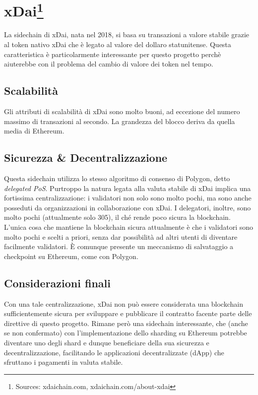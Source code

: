 \documentclass[a4paper, 12pt]{article}
\begin{document}
\newpage
\section*{xDai\footnote{Sources: xdaichain.com, xdaichain.com/about-xdai}}
La sidechain di xDai, nata nel 2018, si basa su transazioni a valore stabile grazie al token nativo xDai che è legato al valore del dollaro statunitense.
Questa caratteristica è particolarmente interessante per questo progetto perchè aiuterebbe con il problema del cambio di valore dei token nel tempo.

\subsection*{Scalabilità}
Gli attributi di scalabilità di xDai sono molto buoni, ad eccezione del numero massimo di transazioni al secondo.
La grandezza del blocco deriva da quella media di Ethereum.

\subsection*{Sicurezza \& Decentralizzazione}
Questa sidechain utilizza lo stesso algoritmo di consenso di Polygon, detto \textit{delegated PoS}.
Purtroppo la natura legata alla valuta stabile di xDai implica una fortissima centralizzazione: i validatori non solo sono molto pochi, ma sono anche posseduti da organizzazioni
in collaborazione con xDai. I delegatori, inoltre, sono molto pochi (attualmente solo 305), il ché rende poco sicura la blockchain.
L'unica cosa che mantiene la blockchain sicura attualmente è che i validatori sono molto pochi e scelti a priori, senza dar possibilità ad altri utenti di diventare facilmente validatori.
È comunque presente un meccanismo di salvataggio a checkpoint su Ethereum, come con Polygon.

\subsection*{Considerazioni finali}
Con una tale centralizzazione, xDai non può essere considerata una blockchain sufficientemente sicura per sviluppare e pubblicare il contratto facente parte delle direttive di questo progetto. Rimane però una sidechain interessante, che (anche se non confermato) con l'implementazione dello sharding su Ethereum potrebbe diventare uno degli shard e dunque beneficiare della sua sicurezza e decentralizzazione, facilitando le applicazioni decentralizzate (dApp) che sfruttano i pagamenti in valuta stabile.
\end{document}
